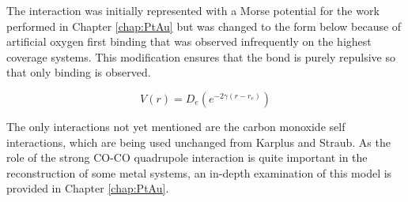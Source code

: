 The  interaction was initially represented with a Morse
potential for the work performed in Chapter \ref{chap:PtAu} but was changed to
the form below because of artificial oxygen first binding that was observed
infrequently on the highest coverage systems. This modification ensures that
the  bond is purely repulsive so that only 
binding is observed.

\begin{equation}
V(r) = D_e(e^{-2\gamma(r-r_e)})
\end{equation}

The only interactions not yet mentioned are the carbon monoxide self
interactions, which are being used unchanged from Karplus and
Straub.\citep{Straub:1991no} As the role of the strong CO-CO quadrupole
interaction is quite important in the reconstruction of some metal
systems,\citep{Tao:2010aa, Eren:2016qt} an in-depth examination of this model
is provided in Chapter \ref{chap:PtAu}.

